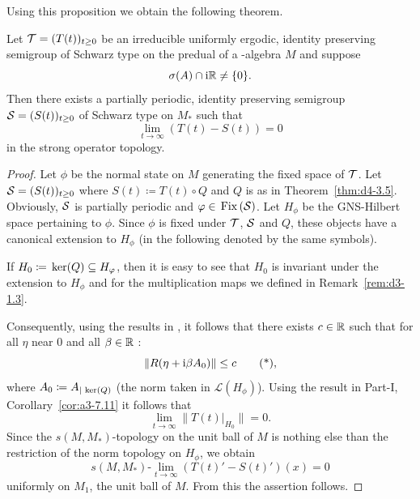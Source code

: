 Using this proposition we obtain the following theorem.
\begin{theorem}\label{thm:d4-3.11}
Let $ \TT = (T(t))_{t \geq 0} $  be an irreducible uniformly ergodic, identity preserving semigroup of Schwarz type on the predual of a \WA-algebra $ M $  and suppose 
%
\[
	\sigma(A) \cap \mathrm{i}\mathbb{R} \neq \{0\} .
\]
%
Then there exists a partially periodic, identity preserving semigroup $ \SG = (S(t))_{t \geq 0} $  of Schwarz type on $ M_{*} $  such that
\[
\lim_{t \to \infty} (T(t) - S(t)) = 0
\]
in the strong operator topology.
\end{theorem}
\begin{proof}
Let $ \phi $  be the normal state on $ M $  generating the fixed space of\/ $ \mathcal{T} $.
Let $ \SG = (S(t))_{t \geq 0} $  where $ S(t) \coloneqq T(t) \circ Q $  and $ Q $  is as in Theorem~\ref{thm:d4-3.5}. 
Obviously, $ \mathcal{S} $  is partially periodic and $ \phi \in \Fix{\SG} $.
Let $ H_{\phi} $  be the GNS-Hilbert space pertaining to $ \phi $.
Since $ \phi $  is fixed under $ \mathcal{T} $, $ \mathcal{S} $  and $ Q $,  these objects have a canonical extension to $ H_{\phi} $  (in the following denoted by the same symbols).

If\/ $ H_{0} \coloneqq \Kern{Q} \subseteq H_{\phi} $,  then it is easy to see that $ H_{0} $  is invariant under the extension to $ H_{\phi} $  and for the multiplication maps we defined in Remark~\ref{rem:d3-1.3}.

Consequently, using the results in \textcite{grohkuemmerer:1982}, it follows that there exists $ c \in \mathbb{R} $  such that for all $ \eta $  near $ 0 $  and all $ \beta \in \mathbb{R} $ :
\begin{equation}
\|R(\eta + \im\beta A_{0})\| \leq c \tag{*} ,
\end{equation}
where $ A_{0} \coloneqq A_{|\mathop{}\mathrm{ker}(Q)} $  (the norm taken in $ \mathcal{L}(H_{\phi}) $).
Using the result in Part-I, Corollary~\ref{cor:a3-7.11} it follows that
\[
\lim_{t \to \infty} \|T(t)|_{H_{0}}\| = 0.
\]
Since the $ s(M,M_{*}) $-topology on the unit ball of\/ $ M $  is nothing else than the restriction of the norm topology on $ H_{\phi} $, we obtain
\[
s(M,M_{*})\text{-}\lim_{t \to \infty} (T(t)' - S(t)')(x) = 0
\]
uniformly on $ M_{1} $, the unit ball of $M$.
From this the assertion follows.
\end{proof}
